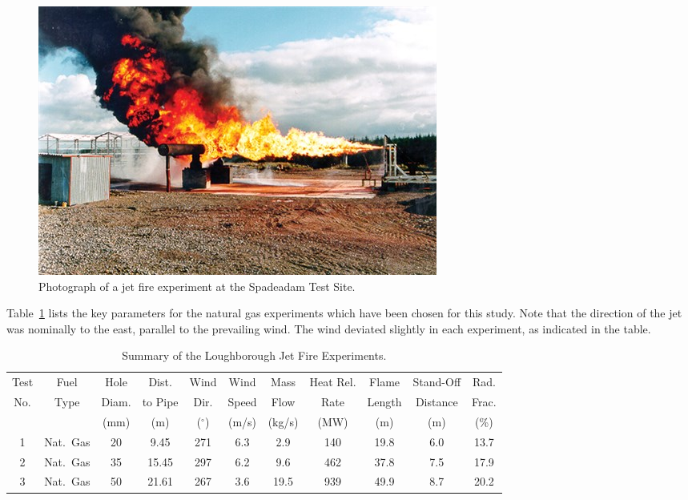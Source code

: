 \begin{figure}[!ht]
\includegraphics[width=\textwidth]{FIGURES/Loughborough_Jet_Fires/Safety-Fig-03_497x335}
\caption[Photograph of a jet fire experiment at the Spadeadam Test Site]{Photograph of a jet fire experiment at the Spadeadam Test Site.}
\label{jet_photo}
\end{figure}

Table~\ref{Loughborough_Parameters} lists the key parameters for the natural gas experiments which have been chosen for this study. Note that the direction of the jet was nominally to the east, parallel to the prevailing wind. The wind deviated slightly in each experiment, as indicated in the table.

\begin{table}[!ht]
\caption[Summary of the Loughborough Jet Fire Experiments]{Summary of the Loughborough Jet Fire Experiments.}
\begin{tabular}{|c|c|c|c|c|c|c|c|c|c|c|}
\hline
Test    & Fuel     & Hole  & Dist.    & Wind          & Wind    & Mass   & Heat Rel.    & Flame     & Stand-Off  & Rad.      \\
No.     & Type     & Diam. & to Pipe  & Dir.          & Speed   & Flow   & Rate         & Length    & Distance   & Frac.     \\ 
        &          & (mm)  & (m)      & ($^\circ$)    & (m/s)   & (kg/s) & (MW)         & (m)       & (m)        & (\%)      \\ \hline
1       & Nat.~Gas & 20    & 9.45     & 271           & 6.3     & 2.9    & 140          & 19.8      & 6.0        & 13.7      \\
2       & Nat.~Gas & 35    & 15.45    & 297           & 6.2     & 9.6    & 462          & 37.8      & 7.5        & 17.9      \\
3       & Nat.~Gas & 50    & 21.61    & 267           & 3.6     & 19.5   & 939          & 49.9      & 8.7        & 20.2      \\ \hline
\end{tabular}
\label{Loughborough_Parameters}
\end{table}

